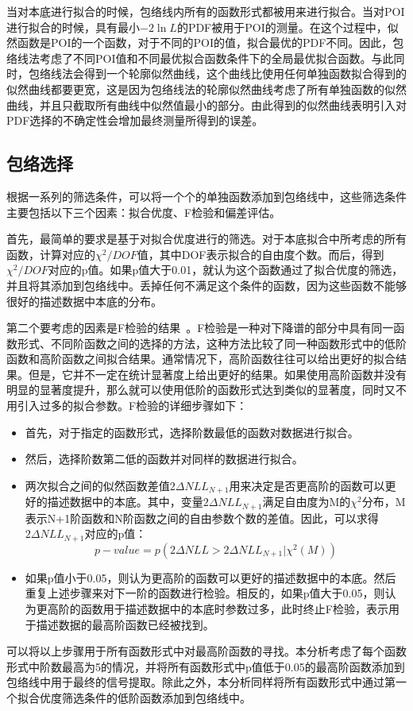当对本底进行拟合的时候，包络线内所有的函数形式都被用来进行拟合。当对POI进行拟合的时候，具有最小$-2\ln{L}$的PDF被用于POI的测量。在这个过程中，似然函数是POI的一个函数，对于不同的POI的值，拟合最优的PDF不同。因此，包络线法考虑了不同POI值和不同最优拟合函数条件下的全局最优拟合函数。与此同时，包络线法会得到一个轮廓似然曲线，这个曲线比使用任何单独函数拟合得到的似然曲线都要更宽，这是因为包络线法的轮廓似然曲线考虑了所有单独函数的似然曲线，并且只截取所有曲线中似然值最小的部分。由此得到的似然曲线表明引入对PDF选择的不确定性会增加最终测量所得到的误差。

\subsection{包络选择}\label{sec:envelope_selection}

根据一系列的筛选条件，可以将一个个的单独函数添加到包络线中，这些筛选条件主要包括以下三个因素：拟合优度、F检验和偏差评估。

首先，最简单的要求是基于对拟合优度进行的筛选。对于本底拟合中所考虑的所有函数，计算对应的$\chi^{2}/DOF$值，其中DOF表示拟合的自由度个数。而后，得到$\chi^{2}/DOF$对应的p值。如果p值大于0.01，就认为这个函数通过了拟合优度的筛选，并且将其添加到包络线中。丢掉任何不满足这个条件的函数，因为这些函数不能够很好的描述数据中本底的分布。

第二个要考虑的因素是F检验的结果~\cite{Khachatryan:2014ira}。F检验是一种对下降谱的部分中具有同一函数形式、不同阶函数之间的选择的方法，这种方法比较了同一种函数形式中的低阶函数和高阶函数之间拟合结果。通常情况下，高阶函数往往可以给出更好的拟合结果。但是，它并不一定在统计显著度上给出更好的结果。如果使用高阶函数并没有明显的显著度提升，那么就可以使用低阶的函数形式达到类似的显著度，同时又不用引入过多的拟合参数。F检验的详细步骤如下：
\begin{itemize}
    \item 首先，对于指定的函数形式，选择阶数最低的函数对数据进行拟合。
    \item 然后，选择阶数第二低的函数并对同样的数据进行拟合。
    \item 两次拟合之间的似然函数差值$2\Delta NLL_{N+1}$用来决定是否更高阶的函数可以更好的描述数据中的本底。其中，变量$2\Delta NLL_{N+1}$满足自由度为M的$\chi^{2}$分布，M表示N+1阶函数和N阶函数之间的自由参数个数的差值。因此，可以求得$2\Delta NLL_{N+1}$对应的p值：
    \begin{equation}
    p-value = p(2\Delta NLL > 2\Delta NLL_{N+1}|\chi^{2}(M))
    \end{equation}
    \item 如果p值小于0.05，则认为更高阶的函数可以更好的描述数据中的本底。然后重复上述步骤来对下一阶的函数进行检验。相反的，如果p值大于0.05，则认为更高阶的函数用于描述数据中的本底时参数过多，此时终止F检验，表示用于描述数据的最高阶函数已经被找到。
\end{itemize}
可以将以上步骤用于所有函数形式中对最高阶函数的寻找。本分析考虑了每个函数形式中阶数最高为5的情况，并将所有函数形式中p值低于0.05的最高阶函数添加到包络线中用于最终的信号提取。除此之外，本分析同样将所有函数形式中通过第一个拟合优度筛选条件的低阶函数添加到包络线中。

